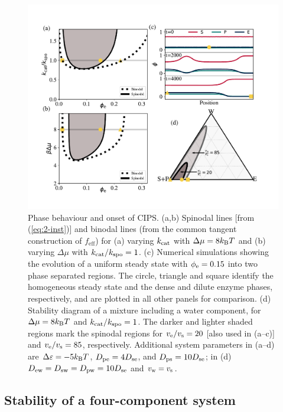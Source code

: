 \begin{figure}
    \centering
    \includegraphics[width=\textwidth]{figures/CIPSphase.pdf}
    \caption{Phase behaviour and onset of CIPS. (a,b) Spinodal lines [from (\ref{eq:2-inst})] and binodal lines (from the common tangent construction of $f_\mathrm{eff}$) for (a) varying $k_{\mathrm{cat}}$ with $\Delta\mu=8 k_{\rm B} T$ and (b) varying $\Delta \mu$ with $k_{\mathrm{cat}}/k_{\mathrm{spo}}=1$. (c) Numerical simulations showing the evolution of a uniform steady state with $\phi_{\mathrm{e}}=0.15$ into two phase separated regions. The circle, triangle and square identify the homogeneous steady state and the dense and dilute enzyme phases, respectively, and are plotted in all other panels for comparison. (d) Stability diagram of a mixture including a water component, for $\Delta\mu=8 k_{\rm B} T$ and $k_{\mathrm{cat}}/k_{\mathrm{spo}}=1$. The darker and lighter shaded regions mark the spinodal regions for $v_{\mathrm{e}}/v_{\mathrm{s}}=20$ [also used in (a--c)] and $v_{\mathrm{e}}/v_{\mathrm{s}}=85$, respectively. Additional system parameters in (a--d) are $\Delta \varepsilon=-5 k_{\rm B} T$, $D_{\mathrm{pe}}=4 D_{\mathrm{se}}$, and $D_{\mathrm{ps}}=10 D_{\mathrm{se}}$; in (d) $D_{\mathrm{ew}}=D_{\mathrm{sw}}=D_{\mathrm{pw}}=10 D_{\mathrm{se}}$ and $v_{\mathrm{w}}=v_{\mathrm{s}}$.}
    \label{fig:CIPSphase}
\end{figure}

\subsection{Stability of a four-component system}


